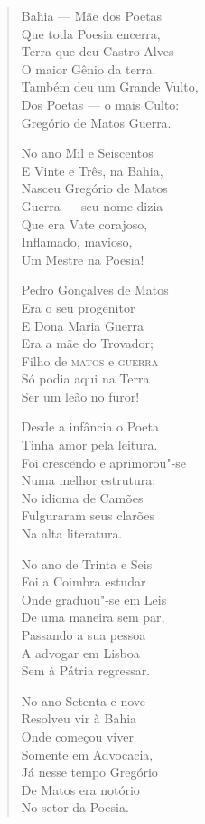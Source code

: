 \begin{verse}
Bahia --- Mãe dos Poetas \\
Que toda Poesia encerra, \\
Terra que deu Castro Alves ---\\
O maior Gênio da terra. \\
Também deu um Grande Vulto, \\
Dos Poetas --- o mais Culto: \\
Gregório de Matos Guerra. 

No ano Mil e Seiscentos \\
E Vinte e Três, na Bahia, \\
Nasceu Gregório de Matos \\
Guerra --- seu nome dizia \\
Que era Vate corajoso, \\
Inflamado, mavioso, \\
Um Mestre na Poesia! 

Pedro Gonçalves de Matos \\
Era o seu progenitor \\
E Dona Maria Guerra \\
Era a mãe do Trovador; \\
Filho de \textsc{matos} e \textsc{guerra} \\
Só podia aqui na Terra \\
Ser um leão no furor! 
\pagebreak

Desde a infância o Poeta \\
Tinha amor pela leitura. \\
Foi crescendo e aprimorou"-se \\
Numa melhor estrutura; \\
No idioma de Camões \\
Fulguraram seus clarões \\
Na alta literatura. 

No ano de Trinta e Seis \\
Foi a Coimbra estudar \\
Onde graduou"-se em Leis \\
De uma maneira sem par, \\
Passando a sua pessoa \\
A advogar em Lisboa \\
Sem à Pátria regressar. 

No ano Setenta e nove \\
Resolveu vir à Bahia \\
Onde começou viver \\
Somente em Advocacia, \\
Já nesse tempo Gregório \\
De Matos era notório \\
No setor da Poesia. 


\end{verse}
